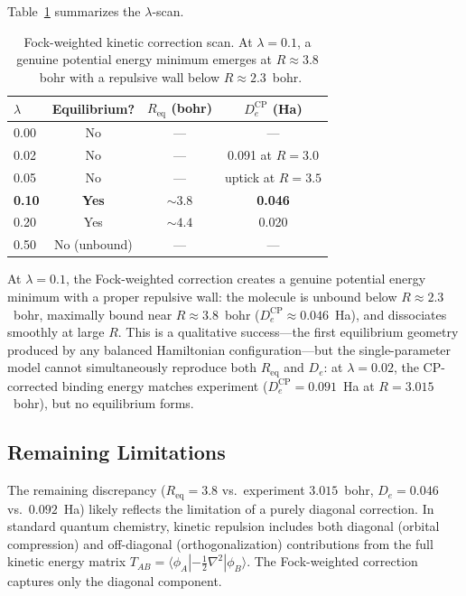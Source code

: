 \documentclass[aps,pra,twocolumn,superscriptaddress,longbibliography]{revtex4-2}
\begin{document}
Table~\ref{tab:fock_scan} summarizes the $\lambda$-scan.

\begin{table}[h]
\centering
\begin{tabular}{lccc}
\toprule
$\lambda$ & Equilibrium? & $R_{\mathrm{eq}}$ (bohr) &
$D_e^{\mathrm{CP}}$ (Ha) \\
\midrule
0.00 & No & --- & --- \\
0.02 & No & --- & 0.091 at $R{=}3.0$ \\
0.05 & No & --- & uptick at $R{=}3.5$ \\
\textbf{0.10} & \textbf{Yes} & $\bm{\sim 3.8}$ &
\textbf{0.046} \\
0.20 & Yes & $\sim 4.4$ & 0.020 \\
0.50 & No (unbound) & --- & --- \\
\bottomrule
\end{tabular}
\caption{Fock-weighted kinetic correction scan.  At $\lambda = 0.1$,
a genuine potential energy minimum emerges at $R\approx 3.8$~bohr with
a repulsive wall below $R \approx 2.3$~bohr.}
\label{tab:fock_scan}
\end{table}

At $\lambda = 0.1$, the Fock-weighted correction creates a genuine
potential energy minimum with a proper repulsive wall: the molecule is
unbound below $R \approx 2.3$~bohr, maximally bound near
$R \approx 3.8$~bohr ($D_e^{\mathrm{CP}} \approx 0.046$~Ha), and
dissociates smoothly at large $R$.  This is a qualitative success---the
first equilibrium geometry produced by any balanced Hamiltonian
configuration---but the single-parameter model cannot simultaneously
reproduce both $R_{\mathrm{eq}}$ and $D_e$: at $\lambda = 0.02$,
the CP-corrected binding energy matches experiment
($D_e^{\mathrm{CP}} = 0.091$~Ha at $R=3.015$~bohr), but no equilibrium
forms.

\subsection{Remaining Limitations}
\label{sec:limitations}

The remaining discrepancy ($R_{\mathrm{eq}} = 3.8$ vs.\ experiment
$3.015$~bohr, $D_e = 0.046$ vs.\ $0.092$~Ha) likely reflects the
limitation of a purely diagonal correction.  In standard quantum
chemistry, kinetic repulsion includes both diagonal (orbital compression)
and off-diagonal (orthogonalization) contributions from the full kinetic
energy matrix $T_{AB} = \langle\phi_A|-\tfrac{1}{2}\nabla^2|\phi_B\rangle$.
The Fock-weighted correction captures only the diagonal component.
\end{document}
